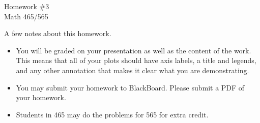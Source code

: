 \documentclass{article}
\begin{document}
\begin{center}
{\Large Homework \#3} \\
\vskip 0.2cm
{\large Math 465/565}
\vskip 0.5cm
\end{center}

A few notes about this homework.
\begin{itemize}
\item You will be graded on your presentation as well as the content of the work.  This means that all of your plots should have axis labels, a title and legends, and any other annotation that makes it clear what you are demonstrating.
\item You may submit your homework to BlackBoard.  Please submit a PDF of your homework. 
\item Students in 465 may do the problems for 565 for extra credit.
\end{itemize}
\end{document}
